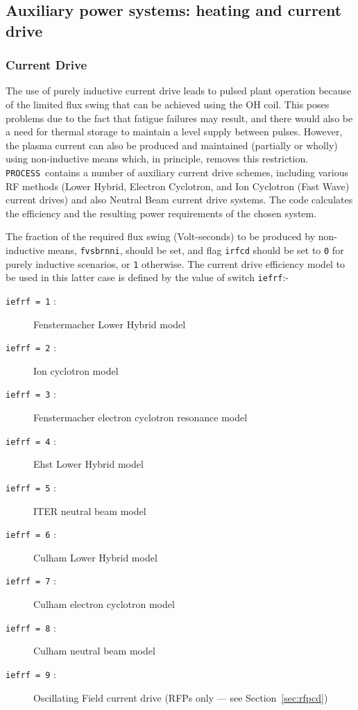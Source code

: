 \documentclass[11pt,a4paper]{report}
\newcommand{\process}{\mbox{\texttt{PROCESS}}}
\begin{document}
\subsection{Auxiliary power systems: heating and current drive}

\subsubsection{Current Drive}

The use of purely inductive current drive leads to pulsed plant operation
because of the limited flux swing that can be achieved using the OH coil. This
poses problems due to the fact that fatigue failures may result, and there
would also be a need for thermal storage to maintain a level supply between
pulses. However, the plasma current can also be produced and maintained
(partially or wholly) using non-inductive means which, in principle, removes
this restriction. \process\ contains a number of auxiliary current drive
schemes, including various RF methods (Lower Hybrid, Electron Cyclotron, and
Ion Cyclotron (Fast Wave) current drives) and also Neutral Beam current drive
systems. The code calculates the efficiency and the resulting power
requirements of the chosen system.

The fraction of the required flux swing (Volt-seconds) to be produced by
non-inductive means, \texttt{fvsbrnni}, should be set, and flag \texttt{irfcd}
should be set to \texttt{0} for purely inductive scenarios, or \texttt{1}
otherwise. The current drive efficiency model to be used in this latter case
is defined by the value of switch \texttt{iefrf}:-

\begin{description}
\item [\texttt{iefrf = 1} :] Fenstermacher Lower Hybrid model
\item [\texttt{iefrf = 2} :] Ion cyclotron model~\cite{IPDG}
\item [\texttt{iefrf = 3} :] Fenstermacher electron cyclotron resonance model
\item [\texttt{iefrf = 4} :] Ehst Lower Hybrid model
\item [\texttt{iefrf = 5} :] ITER neutral beam model~\cite{IPDG,172}
\item [\texttt{iefrf = 6} :] Culham Lower Hybrid model~\cite{172}
\item [\texttt{iefrf = 7} :] Culham electron cyclotron model~\cite{172}
\item [\texttt{iefrf = 8} :] Culham neutral beam model~\cite{172}
\item [\texttt{iefrf = 9} :] Oscillating Field current drive (RFPs only --- see
Section~\ref{sec:rfpcd})
\end{description}
\end{document}
